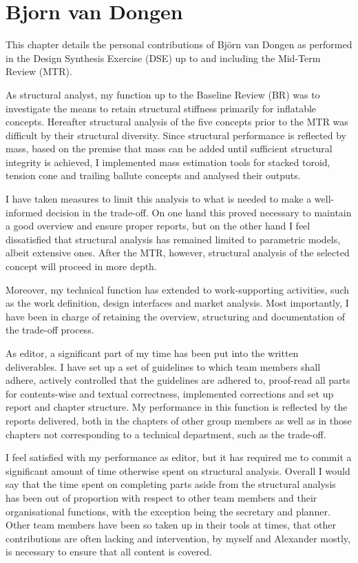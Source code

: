 \section{Bjorn van Dongen}
This chapter details the personal contributions of Bj{\"o}rn van Dongen as performed in the Design Synthesis Exercise (DSE) up to and including the Mid-Term Review (MTR).

As structural analyst, my function up to the Baseline Review (BR) was to investigate the means to retain structural stiffness primarily for inflatable concepts. Hereafter structural analysis of the five concepts prior to the MTR was difficult by their structural diversity. Since structural performance is reflected by mass, based on the premise that mass can be added until sufficient structural integrity is achieved, I implemented mass estimation tools for stacked toroid, tension cone and trailing ballute concepts and analysed their outputs. 

I have taken measures to limit this analysis to what is needed to make a well-informed decision in the trade-off. On one hand this proved necessary to maintain a good overview and ensure proper reports, but on the other hand I feel dissatisfied that structural analysis has remained limited to parametric models, albeit extensive ones. After the MTR, however, structural analysis of the selected concept will proceed in more depth.

Moreover, my technical function has extended to work-supporting activities, such as the work definition, design interfaces and market analysis. Most importantly, I have been in charge of retaining the overview, structuring and documentation of the trade-off process.

As editor, a significant part of my time has been put into the written deliverables. I have set up a set of guidelines to which team members shall adhere, actively controlled that the guidelines are adhered to, proof-read all parts for contents-wise and textual correctness, implemented corrections and set up report and chapter structure. My performance in this function is reflected by the reports delivered, both in the chapters of other group members as well as in those chapters not corresponding to a technical department, such as the trade-off.

I feel satisfied with my performance as editor, but it has required me to commit a significant amount of time otherwise spent on structural analysis. Overall I would say that the time spent on completing parts aside from the structural analysis has been out of proportion with respect to other team members and their organisational functions, with the exception being the secretary and planner. Other team members have been so taken up in their tools at times, that other contributions are often lacking and intervention, by myself and Alexander mostly, is necessary to ensure that all content is covered.

